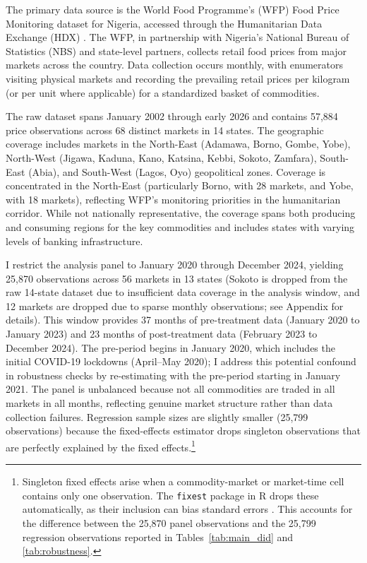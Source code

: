 \documentclass[12pt]{article}
\begin{document}
The primary data source is the World Food Programme's (WFP) Food Price Monitoring dataset for Nigeria, accessed through the Humanitarian Data Exchange (HDX) \citep{wfp2024hdx}. The WFP, in partnership with Nigeria's National Bureau of Statistics (NBS) and state-level partners, collects retail food prices from major markets across the country. Data collection occurs monthly, with enumerators visiting physical markets and recording the prevailing retail prices per kilogram (or per unit where applicable) for a standardized basket of commodities.

The raw dataset spans January 2002 through early 2026 and contains 57,884 price observations across 68 distinct markets in 14 states. The geographic coverage includes markets in the North-East (Adamawa, Borno, Gombe, Yobe), North-West (Jigawa, Kaduna, Kano, Katsina, Kebbi, Sokoto, Zamfara), South-East (Abia), and South-West (Lagos, Oyo) geopolitical zones. Coverage is concentrated in the North-East (particularly Borno, with 28 markets, and Yobe, with 18 markets), reflecting WFP's monitoring priorities in the humanitarian corridor. While not nationally representative, the coverage spans both producing and consuming regions for the key commodities and includes states with varying levels of banking infrastructure.

I restrict the analysis panel to January 2020 through December 2024, yielding 25,870 observations across 56 markets in 13 states (Sokoto is dropped from the raw 14-state dataset due to insufficient data coverage in the analysis window, and 12 markets are dropped due to sparse monthly observations; see Appendix for details). This window provides 37 months of pre-treatment data (January 2020 to January 2023) and 23 months of post-treatment data (February 2023 to December 2024). The pre-period begins in January 2020, which includes the initial COVID-19 lockdowns (April--May 2020); I address this potential confound in robustness checks by re-estimating with the pre-period starting in January 2021. The panel is unbalanced because not all commodities are traded in all markets in all months, reflecting genuine market structure rather than data collection failures. Regression sample sizes are slightly smaller (25,799 observations) because the fixed-effects estimator drops singleton observations that are perfectly explained by the fixed effects.\footnote{Singleton fixed effects arise when a commodity-market or market-time cell contains only one observation. The \texttt{fixest} package in R drops these automatically, as their inclusion can bias standard errors \citep{correia2015singleton}. This accounts for the difference between the 25,870 panel observations and the 25,799 regression observations reported in Tables~\ref{tab:main_did} and \ref{tab:robustness}.}
\end{document}
